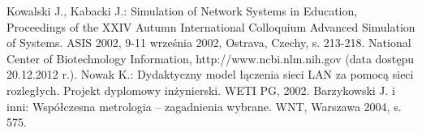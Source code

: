 \documentclass{pginz}
\begin{document}
%
%
\setcounter{page}{3}




\tableofcontents
{}







\listoffigures
{}
\listoftables
{}


\begin{thebibliography}{20}
 Kowalski J., Kabacki J.: Simulation of Network Systems in Education, Proceedings of the XXIV Autumn International Colloquium Advanced Simulation of Systems. ASIS 2002, 9-11 września 2002, Ostrava, Czechy, s. 213-218.
	National Center of Biotechnology Information, http://www.ncbi.nlm.nih.gov (data dostępu 20.12.2012 r.).
	Nowak K.: Dydaktyczny model łączenia sieci LAN za pomocą sieci rozległych. Projekt dyplomowy inżynierski. WETI PG, 2002.
	Barzykowski J. i inni: Współczesna metrologia – zagadnienia wybrane. WNT, Warszawa 2004, s. 575.
\end{thebibliography}

\begin{appendices}
%
%
\end{appendices}
\end{document}
